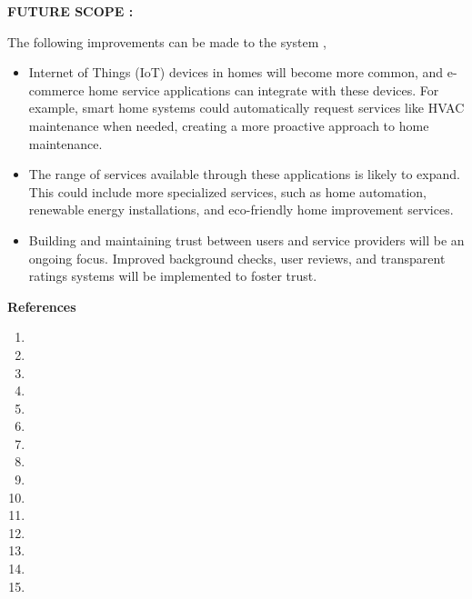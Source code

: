 \documentclass[12pt]{article}
\begin{document}
 \large \textbf{FUTURE SCOPE :}\\[3mm]\par
The following improvements can be made to the system ,
\begin{itemize}
\item Internet of Things (IoT) devices in homes will become more common, and e-commerce home service applications can integrate with these devices. For example, smart home systems could automatically request services like HVAC maintenance when needed, creating a more proactive approach to home maintenance.
\item The range of services available through these applications is likely to expand. This could include more specialized services, such as home automation, renewable energy installations, and eco-friendly home improvement services.
\item Building and maintaining trust between users and service providers will be an ongoing focus. Improved background checks, user reviews, and transparent ratings systems will be implemented to foster trust.

\end{itemize}
 

 
\clearpage


\LARGE \textbf{References }\\[5mm]

\begin{enumerate}
\item  
\item 
\item 
\item 
\item  
\item 
\item 
\item 

\clearpage

\item 
\item 
\item 
\item 
\item 
\item 
\item 
\end{enumerate}


 
\end{document}
